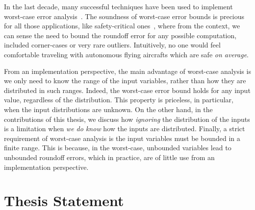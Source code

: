 In the last decade, many successful techniques have been used to implement worst-case error analysis~\cite{darulova2018daisy,2015_fm_sjrg,solovyev2018rigorous,rosa,fptuner,smartfloat,satire,gappa,fluctuat}.
%
%
The soundness of worst-case error bounds is precious for all those applications, like safety-critical ones~\cite{guardstable, cpralg}, where from the context, we can sense the need to bound the roundoff error for any possible computation, included corner-cases or very rare outliers.
%
Intuitively, no one would feel comfortable traveling with autonomous flying aircrafts which are safe \emph{on average}.

%
From an implementation perspective, the main advantage of worst-case analysis is we only need to know the range of the input variables, rather than how they are distributed in such ranges. 
%
Indeed, the worst-case error bound holds for any input value, regardless of the distribution.
%
%
This property is priceless, in particular, when the input distributions are unknown.
%
On the other hand, in the contributions of this thesis, we discuss how \emph{ignoring} the distribution of the inputs is a limitation when \emph{we do know} how the inputs are distributed.
%
Finally, a strict requirement of worst-case analysis is the input variables must be bounded  in a finite range. This is because, in the worst-case, unbounded variables lead to unbounded roundoff errors, which in practice, are of little use from an implementation perspective.
%
\section{Thesis Statement}
%

